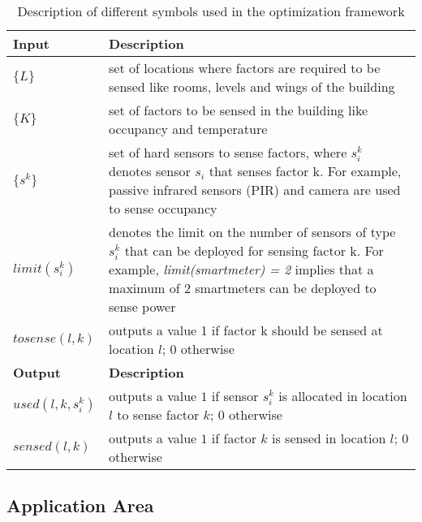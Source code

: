 \documentclass[]{interact}
\theoremstyle{plain}%
\theoremstyle{definition}
\theoremstyle{remark}
\begin{document}
\begin{table}[h]
\caption{Description of different symbols used in the optimization framework}
	\centering
	\begin{tabular}{p{}|p{}}
		\hline
		\textbf{Input} & \textbf{Description}
		\\ \hline
		$\{L\}$                           & set of locations where factors are required to be sensed like rooms, levels and wings of the building
		\\ \hline
		$ \{K\} $                         & set of factors to be sensed in the building like occupancy and temperature
    \\ \hline
    $\{s^k\}$ & set of hard sensors to sense factors, where $s_i^k$ denotes sensor $s_i$ that senses factor k. For example, passive infrared sensors (PIR) and camera are used to sense occupancy
    \\ \hline
    $limit(s_i^k)$ & denotes the limit on the number of sensors of type $s_i^k$ that can be deployed for sensing factor k. For example, \textit{limit(smartmeter) = 2} implies that a maximum of 2 smartmeters can be deployed to sense power
    \\ \hline
    $tosense(l,k)$ & outputs a value 
    1 if factor k should be sensed at location $l$; 0 otherwise
    \\ \hline
    \textbf{Output} & \textbf{Description} 
    \\ \hline
    $used(l,k,s_i^k)$  &  outputs a value $1$ if sensor $s_i^k$ is allocated in location $l$ to sense factor $k$; $0$ otherwise 
    \\ \hline
    $sensed(l,k)$    & outputs a value $1$ if factor $k$ is sensed in location $l$; $0$ otherwise
    \\ \hline
	\end{tabular}
	\label{tab:var}
\end{table}

\subsection{Application Area}
\end{document}
